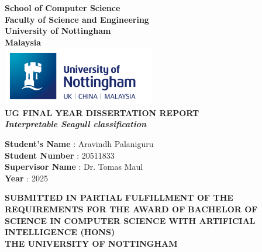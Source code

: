 \documentclass[a4paper,12pt]{article}
\begin{document}
\begin{titlepage}
    \begin{center}

        \textbf{\LARGE{School of Computer Science}}\\[0.5em]
        \textbf{\Large{Faculty of Science and Engineering}}\\[0.5em]
        \textbf{\Large{University of Nottingham}}\\[0.5em]
        \textbf{\Large{Malaysia}}\\[5em]

        \includegraphics[width=0.5\textwidth]{images/nottingham_logo.png}\\[3em]

        \textbf{\Large{UG FINAL YEAR DISSERTATION REPORT}}\\[6em]
        \textbf{\large{\textit{Interpretable Seagull classification}}}\\[6em]

    \end{center}

    \begin{center}
        \begin{minipage}{0.6\textwidth}  %
            \raggedright
            \textbf{Student's Name} \hspace{1.5cm}: Aravindh Palaniguru\\[1em]
            \textbf{Student Number} \hspace{1.4cm}: 20511833\\[1em]
            \textbf{Supervisor Name} \hspace{1.2cm}: Dr. Tomas Maul\\[1em]
            \textbf{Year} \hspace{3.8cm}: 2025\\[4em]
        \end{minipage}
    \end{center}

    \vfill

    \begin{center}
        \begin{minipage}{\textwidth}
            \centering
            {\fontsize{12}{10}\selectfont\textbf{SUBMITTED IN PARTIAL FULFILLMENT OF THE REQUIREMENTS FOR THE AWARD OF}}
            {\fontsize{12}{10}\selectfont\textbf{BACHELOR OF SCIENCE IN COMPUTER SCIENCE WITH ARTIFICIAL INTELLIGENCE (HONS)}}\\
            {\fontsize{12}{10}\selectfont\textbf{THE UNIVERSITY OF NOTTINGHAM}}
        \end{minipage}
    \end{center}
\end{titlepage}
\end{document}
